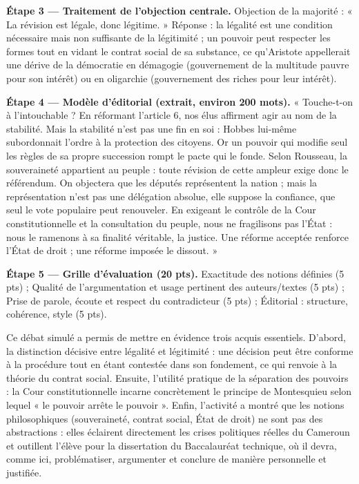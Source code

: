 \documentclass[11pt]{article}
\newcommand{\cle}[1]{{\popxbold\color{popdark}#1}}
\newcounter{popsec}
\newcounter{popsub}
\newcommand{\courssub}[1]{%
  \stepcounter{popsub}%
  \par\vspace{9pt}\noindent{\popxbold\fontsize{11.5}{13}\selectfont\color{popink}{\color{poporange}\thepopsec.\thepopsub}\hspace{6pt}#1}\par\nopagebreak\vspace{4pt}
}
\begin{document}
\begin{exoresolu}
\textbf{Étape 3 — Traitement de l'objection centrale.} Objection de la majorité : « La révision est légale, donc légitime. » Réponse : la légalité est une condition nécessaire mais non suffisante de la légitimité ; un pouvoir peut respecter les formes tout en vidant le contrat social de sa substance, ce qu'Aristote appellerait une dérive de la démocratie en démagogie (gouvernement de la multitude pauvre pour son intérêt) ou en oligarchie (gouvernement des riches pour leur intérêt).

\textbf{Étape 4 — Modèle d'éditorial (extrait, environ \num{200} mots).} « Touche-t-on à l'intouchable ? En réformant l'article 6, nos élus affirment agir au nom de la stabilité. Mais la stabilité n'est pas une fin en soi : Hobbes lui-même subordonnait l'ordre à la protection des citoyens. Or un pouvoir qui modifie seul les règles de sa propre succession rompt le pacte qui le fonde. Selon Rousseau, la souveraineté appartient au peuple : toute révision de cette ampleur exige donc le référendum. On objectera que les députés représentent la nation ; mais la représentation n'est pas une délégation absolue, elle suppose la confiance, que seul le vote populaire peut renouveler. En exigeant le contrôle de la Cour constitutionnelle et la consultation du peuple, nous ne fragilisons pas l'État : nous le ramenons à sa finalité véritable, la justice. Une réforme acceptée renforce l'État de droit ; une réforme imposée le dissout. »

\textbf{Étape 5 — Grille d'évaluation (20 pts).} Exactitude des notions définies (5 pts) ; Qualité de l'argumentation et usage pertinent des auteurs/textes (5 pts) ; Prise de parole, écoute et respect du contradicteur (5 pts) ; Éditorial : structure, cohérence, style (5 pts).
\end{exoresolu}

\courssub{Bilan de l'activité}

Ce débat simulé a permis de mettre en évidence trois acquis essentiels. D'abord, la distinction décisive entre \cle{légalité} et \cle{légitimité} : une décision peut être conforme à la procédure tout en étant contestée dans son fondement, ce qui renvoie à la théorie du contrat social. Ensuite, l'utilité pratique de la \cle{séparation des pouvoirs} : la Cour constitutionnelle incarne concrètement le principe de Montesquieu selon lequel « le pouvoir arrête le pouvoir ». Enfin, l'activité a montré que les notions philosophiques (souveraineté, contrat social, État de droit) ne sont pas des abstractions : elles éclairent directement les crises politiques réelles du Cameroun et outillent l'élève pour la dissertation du Baccalauréat technique, où il devra, comme ici, problématiser, argumenter et conclure de manière personnelle et justifiée.
\end{document}

